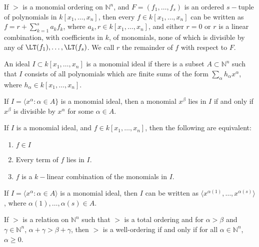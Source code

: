 \documentclass[crop=false,class=article,oneside]{standalone}
\begin{document}
        \begin{theorem}
        If $>$ is a monomial ordering on $\mathbb{N}^n$, and $F = (f_1,\hdots, f_s)$ is an ordered $s-$tuple of polynomials in $k[x_1,\hdots ,x_n]$, then every $f\in k[x_1,\hdots ,x_n]$ can be written as $f = r+\sum_{k=1}^{s} a_k f_k$, where $a_k,r\in k[x_1,\hdots ,x_n]$, and either $r=0$ or $r$ is a linear combination, with coefficients in $k$, of monomials, none of which is divisible by any of $\LT(f_1),\hdots, \LT(f_s)$. We call $r$ the remainder of $f$ with respect to $F$.
        \end{theorem}
        \begin{definition}
        An ideal $I\subset k[x_1,\hdots ,x_n]$ is a monomial ideal if there is a subset $A\subset \mathbb{N}^n$ such that $I$ consists of all polynomials which are finite sums of the form $\sum_{\alpha} h_{\alpha} x^\alpha$, where $h_{\alpha} \in k[x_1,\hdots ,x_n]$. 
        \end{definition}
        \begin{theorem}
        If $I=\langle x^\alpha: \alpha \in A\}$ is a monomial ideal, then a monomial $x^\beta$ lies in $I$ if and only if $x^\beta$ is divisible by $x^\alpha$ for some $\alpha \in A$.
        \end{theorem}
        \begin{theorem}
        If $I$ is a monomial ideal, and $f\in k[x_1,\hdots ,x_n]$, then the following are equivalent:
        \begin{enumerate}
                \item $f\in I$
                \item Every term of $f$ lies in $I$.
                \item $f$ is a $k-$linear combination of the monomials in $I$.
        \end{enumerate}
        \end{theorem}
        \begin{theorem}
        If $I=\langle x^\alpha: \alpha \in A\rangle$ is a monomial ideal, then $I$ can be written as $\langle x^{\alpha(1)}, \hdots, x^{\alpha(s)}\rangle$, where $\alpha(1),\hdots, \alpha(s) \in A$. 
        \end{theorem}
        \begin{theorem}
        If $>$ is a relation on $\mathbb{N}^n$ such that $>$ is a total ordering and for $\alpha>\beta$ and $\gamma\in \mathbb{N}^n$, $\alpha+\gamma>\beta+\gamma$, then $>$ is a well-ordering if and only if for all $\alpha \in \mathbb{N}^n$, $\alpha \geq 0$.
        \end{theorem}
\end{document}
